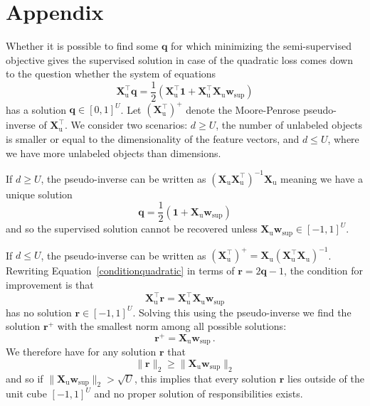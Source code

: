 \documentclass[twoside]{memoir}\usepackage[]{graphicx}\usepackage{xcolor}
\begin{document}
\section*{Appendix}
Whether it is possible to find some $\mathbf{q}$ for which minimizing the semi-supervised objective gives the supervised solution in case of the quadratic loss comes down to the question whether the system of equations
\begin{equation} \label{conditionquadratic}
\mathbf{X}_\mathrm{u} ^\top \mathbf{q} = \frac{1}{2} ( \mathbf{X}_\mathrm{u}^\top \mathbf{1} + \mathbf{X}_\mathrm{u}^\top \mathbf{X}_\mathrm{u} \mathbf{w}_\mathrm{sup} )
\end{equation}
has a solution $\mathbf{q} \in [0,1]^U$.
Let $(\mathbf{X}_\mathrm{u}^\top)^+$ denote the Moore-Penrose pseudo-inverse of $\mathbf{X}_\mathrm{u}^\top$. We consider two scenarios: $d \geq U$, the number of unlabeled objects is smaller or equal to the dimensionality of the feature vectors, and $d \leq U$, where we have more unlabeled objects than dimensions.

If $d \geq U$, the pseudo-inverse can be written as $(\mathbf{X}_\mathrm{u} \mathbf{X}_\mathrm{u}^\top)^{-1} \mathbf{X}_\mathrm{u}$ meaning we have a unique solution
$$
\mathbf{q} = \frac{1}{2} (\mathbf{1} + \mathbf{X}_\mathrm{u} \mathbf{w}_\mathrm{sup})
$$
and so the supervised solution cannot be recovered unless $\mathbf{X}_\mathrm{u} \mathbf{w}_\mathrm{sup} \in [-1,1]^U$.

If $d \leq U$, the pseudo-inverse can be written as $(\mathbf{X}_\mathrm{u}^\top)^+ = \mathbf{X}_\mathrm{u} (\mathbf{X}_\mathrm{u}^\top \mathbf{X}_\mathrm{u})^{-1}$. Rewriting Equation~\eqref{conditionquadratic} in terms of $\mathbf{r} = 2\mathbf{q}-1$, the condition for improvement is that
$$\mathbf{X}_\mathrm{u} ^\top \mathbf{r} = \mathbf{X}_\mathrm{u}^\top \mathbf{X}_\mathrm{u} \mathbf{w}_\mathrm{sup} $$
has no solution $\mathbf{r} \in [-1,1]^U$. Solving this using the pseudo-inverse we find the solution $\mathbf{r}^+$ with the smallest norm among all possible solutions:
$$\mathbf{r}^+ = \mathbf{X}_\mathrm{u} \mathbf{w}_\mathrm{sup} \, .$$
We therefore have for any solution $\mathbf{r}$ that 
$$\| \mathbf{r} \|_2 \ge \| \mathbf{X}_\mathrm{u} \mathbf{w}_\mathrm{sup} \|_2$$
and so if $\| \mathbf{X}_\mathrm{u} \mathbf{w}_\mathrm{sup} \|_2 > \sqrt{U}$, this implies that every solution $\mathbf{r}$ lies outside of the unit cube $[-1,1]^U$ and no proper solution of responsibilities exists.
\end{document}
